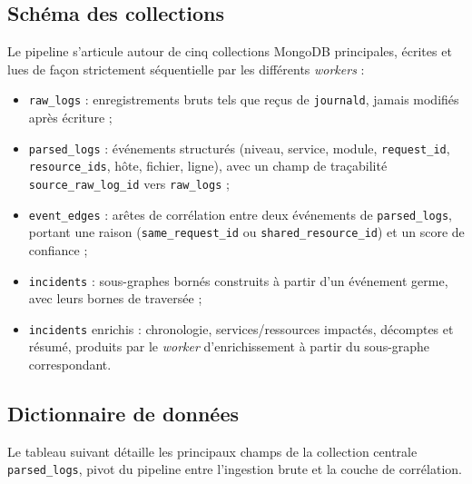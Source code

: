 \documentclass[a4paper,11pt,oneside]{report}
\begin{document}
\subsection{Schéma des collections}
Le pipeline s'articule autour de cinq collections MongoDB principales, écrites et lues de façon strictement séquentielle par les différents \emph{workers} :
\begin{itemize}
    \item \texttt{raw\_logs} : enregistrements bruts tels que reçus de \texttt{journald}, jamais modifiés après écriture ;
    \item \texttt{parsed\_logs} : événements structurés (niveau, service, module, \texttt{request\_id}, \texttt{resource\_ids}, hôte, fichier, ligne), avec un champ de traçabilité \texttt{source\_raw\_log\_id} vers \texttt{raw\_logs} ;
    \item \texttt{event\_edges} : arêtes de corrélation entre deux événements de \texttt{parsed\_logs}, portant une raison (\texttt{same\_request\_id} ou \texttt{shared\_resource\_id}) et un score de confiance ;
    \item \texttt{incidents} : sous-graphes bornés construits à partir d'un événement germe, avec leurs bornes de traversée ;
    \item \texttt{incidents} enrichis : chronologie, services/ressources impactés, décomptes et résumé, produits par le \emph{worker} d'enrichissement à partir du sous-graphe correspondant.
\end{itemize}

\subsection{Dictionnaire de données}
Le tableau suivant détaille les principaux champs de la collection centrale \texttt{parsed\_logs}, pivot du pipeline entre l'ingestion brute et la couche de corrélation.
\end{document}
